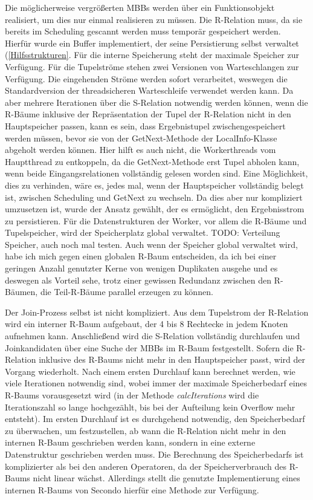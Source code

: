 \documentclass[a4paper,12pt,twoside]{article}
\newcommand{\Fb}[1]{\textit{#1}} %
\begin{document}
Die möglicherweise vergrößerten MBBs werden über ein Funktionsobjekt realisiert, um dies nur einmal realisieren zu müssen. Die R-Relation muss, da sie bereits im Scheduling gescannt werden muss temporär gespeichert werden. Hierfür wurde ein Buffer implementiert, der seine Persistierung selbst verwaltet (\autoref{Hilfsstrukturen}. Für die interne Speicherung steht der maximale Speicher zur Verfügung. Für die Tupelströme stehen zwei Versionen von Warteschlangen zur Verfügung. Die eingehenden Ströme werden sofort verarbeitet, weswegen die Standardversion der threadsicheren Warteschleife verwendet werden kann. Da aber mehrere Iterationen über die S-Relation notwendig werden können, wenn die R-Bäume inklusive der Repräsentation der Tupel der R-Relation nicht in den Hauptspeicher passen, kann es sein, dass Ergebnistupel zwischengespeichert werden müssen, bevor sie von der GetNext-Methode der LocalInfo-Klasse abgeholt werden können. Hier hilft es auch nicht, die Workerthreads vom Hauptthread zu entkoppeln, da die GetNext-Methode erst Tupel abholen kann, wenn beide Eingangsrelationen vollständig gelesen worden sind. Eine Möglichkeit, dies zu verhinden, wäre es, jedes mal, wenn der Hauptspeicher vollständig belegt ist, zwischen Scheduling und GetNext zu wechseln. Da dies aber nur kompliziert umzusetzen ist, wurde der Ansatz gewählt, der es ermöglicht, den Ergebnisstrom zu persistieren. Für die Datenstrukturen der Worker, vor allem die R-Bäume und Tupelspeicher, wird der Speicherplatz global verwaltet. TODO: Verteilung Speicher, auch noch mal testen. Auch wenn der Speicher global verwaltet wird, habe ich mich gegen einen globalen R-Baum entscheiden, da ich bei einer geringen Anzahl genutzter Kerne von wenigen Duplikaten ausgehe und es deswegen als Vorteil sehe, trotz einer gewissen Redundanz zwischen den R-Bäumen, die Teil-R-Bäume parallel erzeugen zu können.

Der Join-Prozess selbst ist nicht kompliziert. Aus dem Tupelstrom der R-Relation wird ein interner R-Baum aufgebaut, der 4 bis 8 Rechtecke in jedem Knoten aufnehmen kann. Anschließend wird die S-Relation vollständig durchlaufen und Joinkandidaten über eine Suche der MBBs im R-Baum festgestellt. Sofern die R-Relation inklusive des R-Baums nicht mehr in den Hauptspeicher passt, wird der Vorgang wiederholt. Nach einem ersten Durchlauf kann berechnet werden, wie viele Iterationen notwendig sind, wobei immer der maximale Speicherbedarf eines R-Baums vorausgesetzt wird (in der Methode \Fb{calcIterations} wird die Iterationszahl so lange hochgezählt, bis bei der Aufteilung kein Overflow mehr entsteht). Im ersten Durchlauf ist es durchgehend notwendig, den Speicherbedarf zu überwachen, um festzustellen, ab wann die R-Relation nicht mehr in den internen R-Baum geschrieben werden kann, sondern in eine externe Datenstruktur geschrieben werden muss. Die Berechnung des Speicherbedarfs ist komplizierter als bei den anderen Operatoren, da der Speicherverbrauch des R-Baums nicht linear wächst. Allerdings stellt die genutzte Implementierung eines internen R-Baums von Secondo hierfür eine Methode zur Verfügung.
\end{document}
